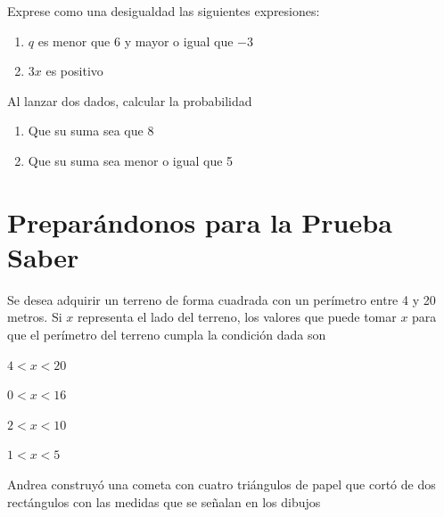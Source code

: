 \documentclass[letterpaper,fleqn]{article}
\begin{document}
\begin{enumerate}
\begin{enumerate}
\begin{multicols}{2}
    \end{multicols}
  \end{enumerate}
  \item Exprese como una desigualdad las siguientes expresiones:
  \begin{enumerate}
    \item $ q $ es menor que 6 y mayor o igual que $ -3 $ \hspace*{1cm} \underline{\hspace*{4cm}}
    \item $3x$ es positivo \hspace*{1cm} \underline{\hspace*{4cm}}
  \end{enumerate}
  \item Al lanzar dos dados, calcular la probabilidad
  \begin{enumerate}
  \item Que su suma sea que 8
  \item Que su suma sea menor o igual que 5
  \end{enumerate}
   \section*{Preparándonos para la Prueba Saber}
\item Se desea adquirir un terreno de forma cuadrada con un perímetro entre 4 y 20 metros. Si $x$ representa el lado del terreno, los valores que puede tomar $x$ para que el
perímetro del terreno cumpla la condición dada son
\begin{enumerate}
\begin{multicols}{4}
\item $4<x<20$
\item $0<x<16$
\item $2<x<10$
\item $1<x<5$
\end{multicols}
\end{enumerate}
\begin{minipage}{.4\textwidth}
\item Andrea construyó una cometa con cuatro triángulos de papel que cortó de dos rectángulos con las medidas que se señalan en los dibujos
\end{minipage}
\begin{minipage}{.55\textwidth}
\end{minipage}


\end{enumerate}
\end{document}
